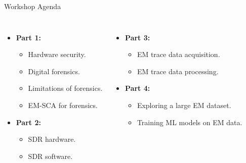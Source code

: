 \documentclass[handout]{beamer}
\begin{document}
\begin{frame}{Workshop Agenda}  

\begin{columns}


	\begin{itemize}
	\footnotesize
	\item \textbf{Part 1:}
		\begin{itemize}
		\footnotesize
		\item Hardware security.
		\item Digital forensics.
		\item Limitations of forensics.
		\item EM-SCA for forensics.
		\end{itemize}
		\vspace{10pt}
	\item \textbf{Part 2:}
		\begin{itemize}
		\footnotesize
    		\item SDR hardware.
    		\item SDR software.
		\end{itemize}
	\end{itemize}


	\begin{itemize}
	\footnotesize
	\item \textbf{Part 3:}
		\begin{itemize}
		\footnotesize
    		\item EM trace data acquisition.
    		\item EM trace data processing.
		\end{itemize}
		\vspace{10pt}
	\item \textbf{Part 4:}
		\begin{itemize}
		\footnotesize
    		\item Exploring a large EM dataset.
    		\item Training ML models on EM data.
		\end{itemize}
	\end{itemize}

\end{columns}

\end{frame}
\end{document}
